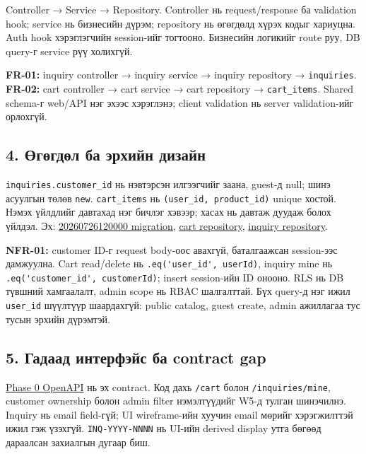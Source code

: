 \documentclass[
  11pt,
  a4paper,
]{article}
\begin{document}
Controller → Service → Repository. Controller нь request/response ба
validation hook; service нь бизнесийн дүрэм; repository нь өгөгдөлд
хүрэх кодыг хариуцна. Auth hook хэрэглэгчийн session-ийг тогтооно.
Бизнесийн логикийг route руу, DB query-г service рүү холихгүй.

\textbf{FR-01:} inquiry controller → inquiry service → inquiry
repository → \nolinkurl{inquiries}. \textbf{FR-02:} cart controller →
cart service → cart repository → \nolinkurl{cart_items}. Shared schema-г
web/API нэг эхээс хэрэглэнэ; client validation нь server validation-ийг
орлохгүй.

\subsection{4. Өгөгдөл ба эрхийн
дизайн}\label{doc6-ux4e9ux433ux4e9ux433ux434ux4e9ux43b-ux431ux430-ux44dux440ux445ux438ux439ux43d-ux434ux438ux437ux430ux439ux43d}

\nolinkurl{inquiries.customer_id} нь нэвтэрсэн илгээгчийг заана, guest-д
null; шинэ асуулгын төлөв \nolinkurl{new}. \nolinkurl{cart_items} нь
\nolinkurl{(user_id, product_id)} unique хостой. Нэмэх үйлдлийг давтахад
нэг бичлэг хэвээр; хасах нь давтаж дуудаж болох үйлдэл. Эх:
\href{../../../supabase/migrations/20260726120000_inquiry_customer_and_cart.sql}{20260726120000
migration},
\href{../../../backend/api/src/repositories/supabase/cart.repository.ts}{cart
repository},
\href{../../../backend/api/src/repositories/supabase/inquiry.repository.ts}{inquiry
repository}.

\textbf{NFR-01:} customer ID-г request body-оос авахгүй, баталгаажсан
session-ээс дамжуулна. Cart read/delete нь
\nolinkurl{.eq('user_id', userId)}, inquiry mine нь
\nolinkurl{.eq('customer_id', customerId)}; insert session-ийн ID
онооно. RLS нь DB түвшний хамгаалалт, admin scope нь RBAC шалгалттай.
Бүх query-д нэг ижил \nolinkurl{user_id} шүүлтүүр шаардахгүй: public
catalog, guest create, admin ажиллагаа тус тусын эрхийн дүрэмтэй.

\clearpage
\subsection{5. Гадаад интерфэйс ба contract
gap}\label{doc6-ux433ux430ux434ux430ux430ux434-ux438ux43dux442ux435ux440ux444ux44dux439ux441-ux431ux430-contract-gap}

\href{../../phase-0/06-api-spec.yaml}{Phase 0 OpenAPI} нь эх contract.
Код дахь \nolinkurl{/cart} болон \nolinkurl{/inquiries/mine}, customer
ownership болон admin filter нэмэлтүүдийг W5-д тулган шинэчилнэ. Inquiry
нь email field-гүй; UI wireframe-ийн хуучин email мөрийг хэрэгжилттэй
ижил гэж үзэхгүй. \nolinkurl{INQ-YYYY-NNNN} нь UI-ийн derived display
утга бөгөөд дараалсан захиалгын дугаар биш.
\end{document}
